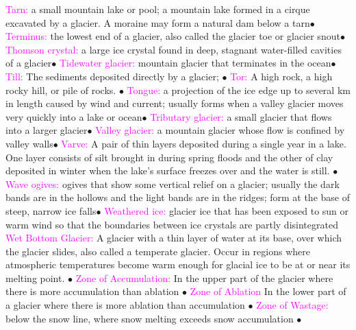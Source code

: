 \documentclass{article}
\newcommand{\ddd}{$\bullet$}
\newcommand{\pink}[1]{\textcolor{magenta}{#1}}
\newcommand{\vocab}[1]{{\pink{#1}}}
\begin{document}
\begin{multicols*}{4}
		\vocab{        Tarn: } a small mountain lake or pool; a mountain lake formed in a cirque excavated by a glacier. A moraine may form a natural dam below a tarn\ddd
		\vocab{        Terminus: } the lowest end of a glacier, also called the glacier toe or glacier snout\ddd
		\vocab{        Thomson crystal: } a large ice crystal found in deep, stagnant water-filled cavities of a glacier\ddd
		\vocab{        Tidewater glacier: } mountain glacier that terminates in the ocean\ddd
		\vocab{Till: } The sediments deposited directly by a glacier; \ddd
		\vocab{Tor: } A high rock, a high rocky hill, or pile of rocks. \ddd
		\vocab{        Tongue: } a projection of the ice edge up to several km in length caused by wind and current; usually forms when a valley glacier moves very quickly into a lake or ocean\ddd
		\vocab{        Tributary glacier: } a small glacier that flows into a larger glacier\ddd
		\vocab{        Valley glacier: } a mountain glacier whose flow is confined by valley walls\ddd
		\vocab{Varve: } A pair of thin layers deposited during a single year in a lake. One layer consists of silt brought in during spring floods and the other of clay deposited in winter when the lake's surface freezes over and the water is still. \ddd
		\vocab{        Wave ogives: } ogives that show some vertical relief on a glacier; usually the dark bands are in the hollows and the light bands are in the ridges; form at the base of steep, narrow ice falls\ddd
		\vocab{        Weathered ice: } glacier ice that has been exposed to sun or warm wind so that the boundaries between ice crystals are partly disintegrated
		\vocab{Wet Bottom Glacier: } A glacier with a thin layer of water at its base, over which the glacier slides, also called a temperate glacier. Occur in regions where atmospheric temperatures become warm enough for glacial ice to be at or near its melting point. \ddd
		\vocab{Zone of Accumulation: } In the upper part of the glacier where there is more accumulation than ablation \ddd
		\vocab{Zone of Ablation} In the lower part of a glacier where there is more ablation than accumulation \ddd
		\vocab{Zone of Wastage: } below the snow line, where snow melting exceeds snow accumulation \ddd

	   	
	\end{multicols*}
\end{document}
